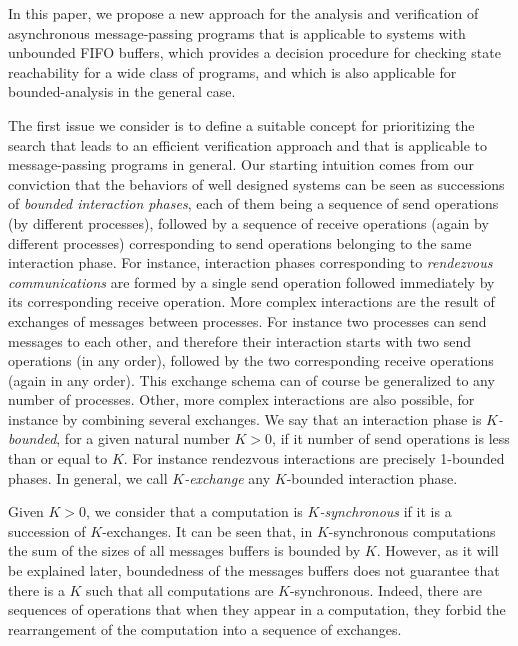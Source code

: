 In this paper, we propose a new approach for the analysis and verification of asynchronous message-passing programs that is applicable to systems with unbounded FIFO buffers, which provides a decision procedure for checking state reachability for a wide class of programs, and which is also applicable for bounded-analysis in the general case. 

The first issue we consider is to define a suitable concept for prioritizing the search that leads to an efficient verification approach and that is applicable to message-passing programs in general. Our starting intuition comes from our conviction that the behaviors of well designed systems can be seen as successions of {\em bounded interaction phases}, each of them being a sequence of send operations (by different processes), followed by a sequence of receive operations (again by different processes) corresponding to send operations belonging to the same interaction phase. For instance, interaction phases corresponding to {\em rendezvous communications} are formed by a single send operation followed immediately by its corresponding receive operation. More complex interactions are the result of exchanges of messages between processes. For instance two processes can send messages to each other, and therefore their interaction starts with two send operations (in any order), followed by the two corresponding receive operations (again in any order). This exchange schema can of course be generalized to any number of processes. Other, more complex interactions are also possible, for instance by combining several exchanges. We say that an interaction phase is {\em $K$-bounded}, for a given natural number $K > 0$, if it number of send operations is less than or equal to $K$. For instance rendezvous interactions are precisely 1-bounded phases.  In general, we call {\em $K$-exchange} any $K$-bounded interaction phase. 

Given $K > 0$, we consider that a computation is {\em $K$-synchronous} if it is a succession of $K$-exchanges.
It can be seen that, in $K$-synchronous computations the sum of the sizes of all messages buffers is bounded by $K$. However, as it will be explained later, boundedness of the messages buffers does not guarantee that there is a $K$ such that all computations are $K$-synchronous. Indeed, there are sequences of operations that when they appear in a computation, they forbid the rearrangement of the computation into a sequence of exchanges.  

